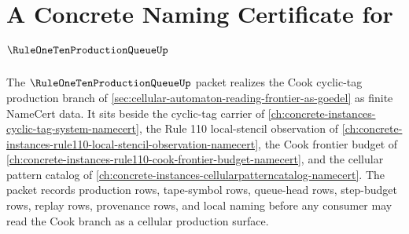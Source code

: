 \chapter{A Concrete Naming Certificate for $\RuleOneTenProductionQueueUp$}
\label{ch:concrete-instances-rule-one-ten-production-queue-namecert}

The $\RuleOneTenProductionQueueUp$ packet realizes the Cook cyclic-tag production branch of \autoref{sec:cellular-automaton-reading-frontier-as-goedel} as finite NameCert data. It sits beside the cyclic-tag carrier of \autoref{ch:concrete-instances-cyclic-tag-system-namecert}, the Rule 110 local-stencil observation of \autoref{ch:concrete-instances-rule110-local-stencil-observation-namecert}, the Cook frontier budget of \autoref{ch:concrete-instances-rule110-cook-frontier-budget-namecert}, and the cellular pattern catalog of \autoref{ch:concrete-instances-cellularpatterncatalog-namecert}. The packet records production rows, tape-symbol rows, queue-head rows, step-budget rows, replay rows, provenance rows, and local naming before any consumer may read the Cook branch as a cellular production surface.

